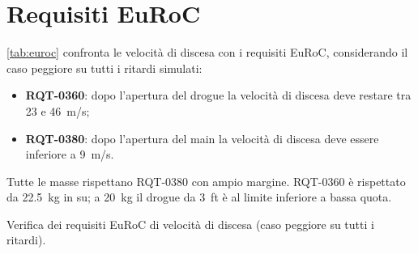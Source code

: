 \documentclass[11pt,a4paper]{article}
\begin{document}
\FloatBarrier
\section{Requisiti EuRoC}
\autoref{tab:euroc} confronta le velocità di discesa con i requisiti EuRoC, considerando il caso peggiore su
tutti i ritardi simulati:
\begin{itemize}
  \item \textbf{RQT-0360}: dopo l'apertura del drogue la velocità di discesa deve restare tra 23 e \SI{46}{m/s};
  \item \textbf{RQT-0380}: dopo l'apertura del main la velocità di discesa deve essere inferiore a \SI{9}{m/s}.
\end{itemize}
Tutte le masse rispettano RQT-0380 con ampio margine. RQT-0360 è rispettato da \SI{22.5}{kg} in su; a
\SI{20}{kg} il drogue da \SI{3}{ft} è al limite inferiore a bassa quota.

\begin{table}[htbp]
  \centering
  \caption{Verifica dei requisiti EuRoC di velocità di discesa (caso peggiore su tutti i ritardi).}
  \label{tab:euroc}
  \begin{adjustbox}{max width=\textwidth}
    
  \end{adjustbox}
\end{table}


\end{document}
